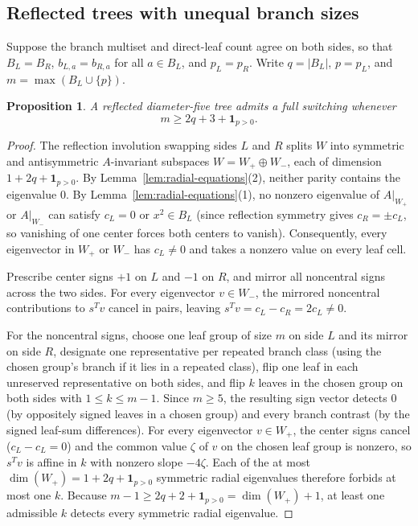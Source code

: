 \documentclass[11pt]{article}
\theoremstyle{plain}
\newtheorem{proposition}[theorem]{Proposition}
\theoremstyle{remark}
\begin{document}
\subsection{Reflected trees with unequal branch sizes}\label{sec:reflected-unequal}

Suppose the branch multiset and direct-leaf count agree on both sides, so that
$B_L = B_R$, $b_{L,a} = b_{R,a}$ for all $a \in B_L$, and $p_L = p_R$. Write
$q = |B_L|$, $p = p_L$, and $m = \max(B_L \cup \{p\})$.

\begin{proposition}\label{prop:reflected}
A reflected diameter-five tree admits a full switching whenever
\[
  m \geq 2q + 3 + \mathbf{1}_{p > 0}.
\]
\end{proposition}

\begin{proof}
The reflection involution swapping sides $L$ and $R$ splits $W$ into symmetric
and antisymmetric $A$-invariant subspaces $W = W_+ \oplus W_-$, each of
dimension $1 + 2q + \mathbf{1}_{p > 0}$. By Lemma~\ref{lem:radial-equations}(2),
neither parity contains the eigenvalue $0$. By
Lemma~\ref{lem:radial-equations}(1), no nonzero eigenvalue of $A|_{W_+}$ or
$A|_{W_-}$ can satisfy $c_L = 0$ or $x^2 \in B_L$ (since reflection symmetry
gives $c_R = \pm c_L$, so vanishing of one center forces both centers to
vanish). Consequently, every eigenvector in $W_+$ or $W_-$ has $c_L \neq 0$ and
takes a nonzero value on every leaf cell.

Prescribe center signs $+1$ on $L$ and $-1$ on $R$, and mirror all noncentral
signs across the two sides. For every eigenvector $v \in W_-$, the mirrored
noncentral contributions to $s^T v$ cancel in pairs, leaving
$s^T v = c_L - c_R = 2 c_L \neq 0$.

For the noncentral signs, choose one leaf group of size $m$ on side $L$ and its
mirror on side $R$, designate one representative per repeated branch class
(using the chosen group's branch if it lies in a repeated class), flip one leaf
in each unreserved representative on both sides, and flip $k$ leaves in the
chosen group on both sides with $1 \leq k \leq m - 1$. Since $m \geq 5$, the
resulting sign vector detects $0$ (by oppositely signed leaves in a chosen
group) and every branch contrast (by the signed leaf-sum differences). For
every eigenvector $v \in W_+$, the center signs cancel ($c_L - c_L = 0$) and
the common value $\zeta$ of $v$ on the chosen leaf group is nonzero, so
$s^T v$ is affine in $k$ with nonzero slope $-4\zeta$. Each of the at most
$\dim(W_+) = 1 + 2q + \mathbf{1}_{p>0}$ symmetric radial eigenvalues therefore
forbids at most one $k$. Because
$m - 1 \geq 2q + 2 + \mathbf{1}_{p > 0} = \dim(W_+) + 1$, at least one
admissible $k$ detects every symmetric radial eigenvalue.
\end{proof}
\end{document}
